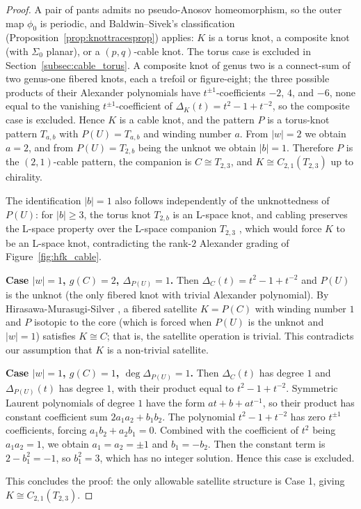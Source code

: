 \begin{proof}
A pair of pants admits no pseudo-Anosov homeomorphism, so the outer map $\phi_0$ is periodic, and Baldwin--Sivek's classification (Proposition~\ref{prop:knottracesprop}) applies: $K$ is a torus knot, a composite knot (with $\Sigma_0$ planar), or a $(p,q)$-cable knot. The torus case is excluded in Section~\ref{subsec:cable_torus}. A composite knot of genus two is a connect-sum of two genus-one fibered knots, each a trefoil or figure-eight; the three possible products of their Alexander polynomials have $t^{\pm 1}$-coefficients $-2$, $4$, and $-6$, none equal to the vanishing $t^{\pm 1}$-coefficient of $\Delta_K(t) = t^2 - 1 + t^{-2}$, so the composite case is excluded. Hence $K$ is a cable knot, and the pattern $P$ is a torus-knot pattern $T_{a,b}$ with $P(U) = T_{a,b}$ and winding number $a$. From $|w| = 2$ we obtain $a = 2$, and from $P(U) = T_{2,b}$ being the unknot we obtain $|b| = 1$. Therefore $P$ is the $(2,1)$-cable pattern, the companion is $C \cong T_{2,3}$, and $K \cong C_{2,1}(T_{2,3})$ up to chirality.

The identification $|b| = 1$ also follows independently of the unknottedness of $P(U)$: for $|b| \geq 3$, the torus knot $T_{2,b}$ is an L-space knot, and cabling preserves the L-space property over the L-space companion $T_{2,3}$ \cite{HeddenCableLSpace}, which would force $K$ to be an L-space knot, contradicting the rank-$2$ Alexander grading of Figure~\ref{fig:hfk_cable}.

\textbf{Case $|w| = 1$, $g(C) = 2$, $\Delta_{P(U)} = 1$.} Then $\Delta_C(t) = t^2 - 1 + t^{-2}$ and $P(U)$ is the unknot (the only fibered knot with trivial Alexander polynomial). By Hirasawa-Murasugi-Silver \cite{HirasawaMurasugiSilver2008}, a fibered satellite $K = P(C)$ with winding number $1$ and $P$ isotopic to the core (which is forced when $P(U)$ is the unknot and $|w| = 1$) satisfies $K \cong C$; that is, the satellite operation is trivial. This contradicts our assumption that $K$ is a non-trivial satellite.

\textbf{Case $|w| = 1$, $g(C) = 1$, $\deg \Delta_{P(U)} = 1$.} Then $\Delta_C(t)$ has degree $1$ and $\Delta_{P(U)}(t)$ has degree $1$, with their product equal to $t^2 - 1 + t^{-2}$. Symmetric Laurent polynomials of degree $1$ have the form $at + b + at^{-1}$, so their product has constant coefficient sum $2a_1 a_2 + b_1 b_2$. The polynomial $t^2 - 1 + t^{-2}$ has zero $t^{\pm 1}$ coefficients, forcing $a_1 b_2 + a_2 b_1 = 0$. Combined with the coefficient of $t^2$ being $a_1 a_2 = 1$, we obtain $a_1 = a_2 = \pm 1$ and $b_1 = -b_2$. Then the constant term is $2 - b_1^2 = -1$, so $b_1^2 = 3$, which has no integer solution. Hence this case is excluded.

This concludes the proof: the only allowable satellite structure is Case 1, giving $K \cong C_{2,1}(T_{2,3})$.
\end{proof}

